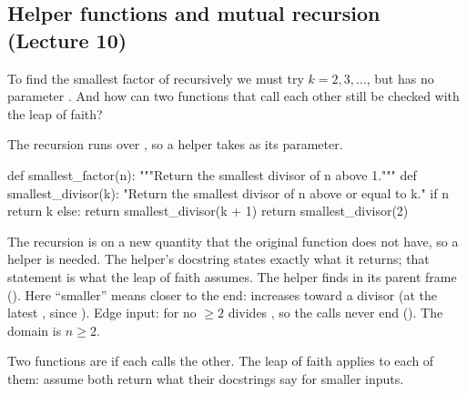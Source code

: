 \documentclass[10pt]{scrartcl}
\begin{document}
\subsection{Helper functions and mutual recursion (Lecture 10)}
\begin{qbox}
  To find the smallest factor of  recursively we must try $k = 2, 3, \dots$, but  has no parameter . And how can two functions that call each other still be checked with the leap of faith?
\end{qbox}
\begin{example*}
The recursion runs over , so a helper takes  as its parameter.
\begin{py}
def smallest_factor(n):
    """Return the smallest divisor of n above 1."""
    def smallest_divisor(k):
        "Return the smallest divisor of n above or equal to k."
        if n %
            return k
        else:
            return smallest_divisor(k + 1)
    return smallest_divisor(2)
\end{py}
\begin{itemize}
  \ii The recursion is on a new quantity  that the original function does not have, so a helper is needed. The helper's docstring states exactly what it returns; that statement is what the leap of faith assumes. The helper finds  in its parent frame ().
  \ii Here ``smaller'' means closer to the end:  increases toward a divisor (at the latest , since ).
  \ii Edge input: for  no  $\ge 2$ divides , so the calls never end (). The domain is $n\ge2$.
\end{itemize}
\end{example*}
Two functions are  if each calls the other. The leap of faith applies to each of them: assume both return what their docstrings say for smaller inputs.
\end{document}
